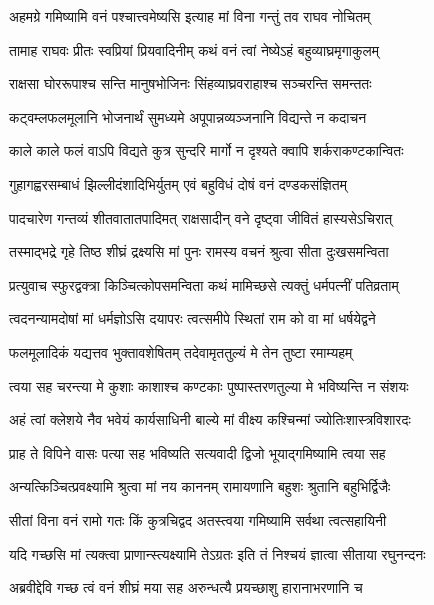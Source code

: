 \twolineshloka
{अहमग्रे गमिष्यामि वनं पश्चात्त्वमेष्यसि}
{इत्याह मां विना गन्तुं तव राघव नोचितम्} %

\twolineshloka
{तामाह राघवः प्रीतः स्वप्रियां प्रियवादिनीम्}
{कथं वनं त्वां नेष्येऽहं बहुव्याघ्रमृगाकुलम्} %

\twolineshloka
{राक्षसा घोररूपाश्च सन्ति मानुषभोजिनः}
{सिंहव्याघ्रवराहाश्च सञ्चरन्ति समन्ततः} %

\twolineshloka
{कट्वम्लफलमूलानि भोजनार्थं सुमध्यमे}
{अपूपान्नव्यञ्जनानि विद्यन्ते न कदाचन} %

\twolineshloka
{काले काले फलं वाऽपि विद्यते कुत्र सुन्दरि}
{मार्गो न दृश्यते क्वापि शर्कराकण्टकान्वितः} %

\twolineshloka
{गुहागह्वरसम्बाधं झिल्लीदंशादिभिर्युतम्}
{एवं बहुविधं दोषं वनं दण्डकसंज्ञितम्} %

\twolineshloka
{पादचारेण गन्तव्यं शीतवातातपादिमत्}
{राक्षसादीन् वने दृष्ट्वा जीवितं हास्यसेऽचिरात्} %

\twolineshloka
{तस्माद्भद्रे गृहे तिष्ठ शीघ्रं द्रक्ष्यसि मां पुनः}
{रामस्य वचनं श्रुत्वा सीता दुःखसमन्विता} %

\twolineshloka
{प्रत्युवाच स्फुरद्वक्त्रा किञ्चित्कोपसमन्विता}
{कथं मामिच्छसे त्यक्तुं धर्मपत्नीं पतिव्रताम्} %

\twolineshloka
{त्वदनन्यामदोषां मां धर्मज्ञोऽसि दयापरः}
{त्वत्समीपे स्थितां राम को वा मां धर्षयेद्वने} %

\twolineshloka
{फलमूलादिकं यद्यत्तव भुक्तावशेषितम्}
{तदेवामृततुल्यं मे तेन तुष्टा रमाम्यहम्} %

\twolineshloka
{त्वया सह चरन्त्या मे कुशाः काशाश्च कण्टकाः}
{पुष्पास्तरणतुल्या मे भविष्यन्ति न संशयः} %

\twolineshloka
{अहं त्वां क्लेशये नैव भवेयं कार्यसाधिनी}
{बाल्ये मां वीक्ष्य कश्चिन्मां ज्योतिःशास्त्रविशारदः} %

\twolineshloka
{प्राह ते विपिने वासः पत्या सह भविष्यति}
{सत्यवादी द्विजो भूयाद्गमिष्यामि त्वया सह} %

\twolineshloka
{अन्यत्किञ्चित्प्रवक्ष्यामि श्रुत्वा मां नय काननम्}
{रामायणानि बहुशः श्रुतानि बहुभिर्द्विजैः} %

\twolineshloka
{सीतां विना वनं रामो गतः किं कुत्रचिद्वद}
{अतस्त्वया गमिष्यामि सर्वथा त्वत्सहायिनी} %

\twolineshloka
{यदि गच्छसि मां त्यक्त्वा प्राणान्स्त्यक्ष्यामि तेऽग्रतः}
{इति तं निश्चयं ज्ञात्वा सीताया रघुनन्दनः} %

\twolineshloka
{अब्रवीद्देवि गच्छ त्वं वनं शीघ्रं मया सह}
{अरुन्धत्यै प्रयच्छाशु हारानाभरणानि च} %

